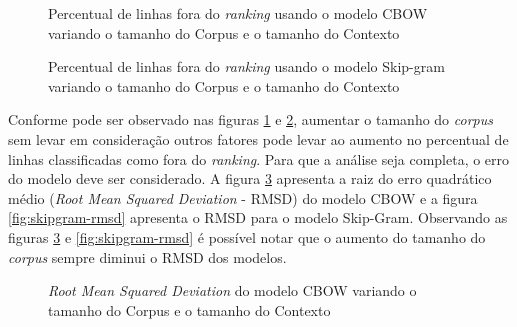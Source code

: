 \documentclass[12pt,openright,twoside,a4paper,article,brazil]{abntex2}
\begin{document}
\begin{figure}[h]
	\centering
	\caption{Percentual de linhas fora do \emph{ranking} usando o modelo CBOW variando o tamanho do Corpus e o tamanho do Contexto}
	\label{fig:cbow-ranking}
\end{figure}

\begin{figure}[h]
	\centering
	\caption{Percentual de linhas fora do \emph{ranking} usando o modelo Skip-gram variando o tamanho do Corpus e o tamanho do Contexto}
	\label{fig:skipgram-ranking}
\end{figure}

Conforme pode ser observado nas figuras \ref{fig:cbow-ranking} e \ref{fig:skipgram-ranking}, aumentar o tamanho do \emph{corpus} sem levar em consideração outros fatores pode levar ao aumento no percentual de linhas classificadas como fora do \emph{ranking}. Para que a análise seja completa, o erro do modelo deve ser considerado. A figura \ref{fig:cbow-rmsd} apresenta a raiz do erro quadrático médio (\emph{Root Mean Squared Deviation} - RMSD) do modelo CBOW e a figura \ref{fig:skipgram-rmsd} apresenta o RMSD para o modelo Skip-Gram. Observando as figuras \ref{fig:cbow-rmsd} e \ref{fig:skipgram-rmsd} é possível notar que o aumento do tamanho do \emph{corpus} sempre diminui o RMSD dos modelos.

\begin{figure}[h]
	\centering
	\caption{\emph{Root Mean Squared Deviation} do modelo CBOW variando o tamanho do Corpus e o tamanho do Contexto}
	\label{fig:cbow-rmsd}
\end{figure}
\end{document}
